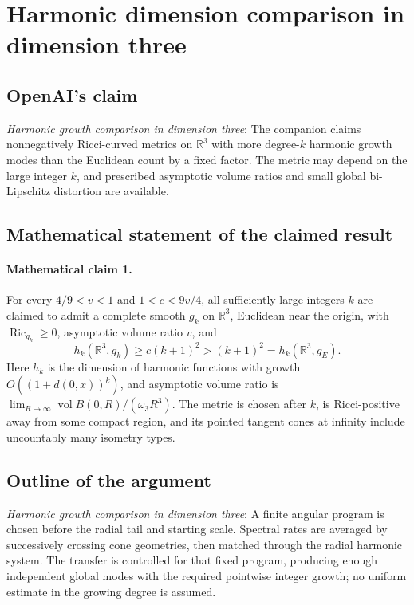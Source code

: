 \documentclass[11pt]{article}
\begin{document}
\section*{Harmonic dimension comparison in dimension three}

\subsection{OpenAI's claim}
\textit{Harmonic growth comparison in dimension three}: The companion claims nonnegatively Ricci-curved metrics on $\mathbb R^3$ with more degree-$k$ harmonic growth modes than the Euclidean count by a fixed factor. The metric may depend on the large integer $k$, and prescribed asymptotic volume ratios and small global bi-Lipschitz distortion are available.

\subsection{Mathematical statement of the claimed result}
\paragraph{Mathematical claim 1.} For every $4/9<v<1$ and $1<c<9v/4$, all sufficiently large integers $k$ are claimed to admit a complete smooth $g_k$ on $\mathbb R^3$, Euclidean near the origin, with $\operatorname{Ric}_{g_k}\ge0$, asymptotic volume ratio $v$, and \[h_k(\mathbb R^3,g_k)\ge c(k+1)^2>(k+1)^2=h_k(\mathbb R^3,g_E).\] Here $h_k$ is the dimension of harmonic functions with growth $O((1+d(0,x))^k)$, and asymptotic volume ratio is $\lim_{R\to\infty}\operatorname{vol}B(0,R)/(\omega_3R^3)$. The metric is chosen after $k$, is Ricci-positive away from some compact region, and its pointed tangent cones at infinity include uncountably many isometry types.

\subsection{Outline of the argument}
\textit{Harmonic growth comparison in dimension three}: A finite angular program is chosen before the radial tail and starting scale. Spectral rates are averaged by successively crossing cone geometries, then matched through the radial harmonic system. The transfer is controlled for that fixed program, producing enough independent global modes with the required pointwise integer growth; no uniform estimate in the growing degree is assumed.
\end{document}
